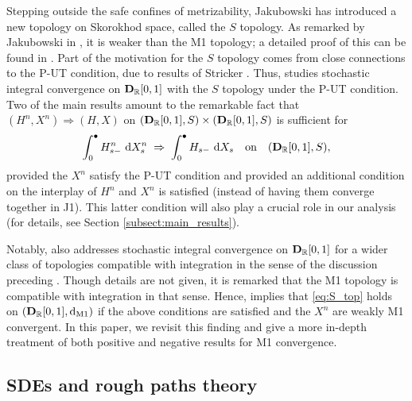 \documentclass[11pt]{article}
\theoremstyle{definition}\newtheorem{example}[theorem]{Example}
\theoremstyle{definition}\newtheorem{counterexample}[theorem]{Counterexample}
\theoremstyle{definition}\newtheorem{remark}[theorem]{Remark}
\theoremstyle{definition}\newtheorem{defi}[theorem]{Definition}
\numberwithin{equation}{section}
\newcommand{\R}{\mathbb{R}}
\newcommand{\D}{{\bf D}}											%
\newcommand*\diff{\mathop{}\!\mathrm{d}}								%
\renewcommand{\|}{\; : \, \;}											%
\newcommand{\dM}{\diff_{\operatorname{M1}}}							%
\begin{document}
Stepping outside the safe confines of metrizability, Jakubowski \cite{jakubowski2} has introduced a new topology on Skorokhod space, called the $S$ topology. As remarked by Jakubowski in \cite{jakubowski}, it is weaker than the M1 topology; a detailed proof of this can be found in \cite{balanjakubowski}. Part of the motivation for the $S
$ topology comes from close connections to the P-UT condition, due to results of Stricker \cite{stricker}. Thus, \cite{jakubowski} studies stochastic integral convergence on $\D_{\R}[0,1]$ with the $S$ topology under the P-UT condition. Two of the main results \cite[Thms.~1 and 6]{jakubowski} amount to the remarkable fact that $(H^n,X^n)\Rightarrow (H,X)$ on $(\D_{\R}[0,1],S) \times (\D_{\R}[0,1],S)$ is sufficient for
\begin{equation}\label{eq:S_top}
	\int_0^\bullet H^n_{s-} \, \diff X^n_s \; \Rightarrow \; \int_0^\bullet H_{s-} \, \diff X_s \quad \text{on} \quad (\D_{\R}[0,1],S),
\end{equation}
provided the $X^n$ satisfy the P-UT condition and provided an additional condition on the interplay of $H^n$ and $X^n$ is satisfied (instead of having them converge together in J1). This latter condition will also play a crucial role in our analysis (for details, see Section \ref{subsect:main_results}).

Notably, \cite{jakubowski} also addresses stochastic integral convergence on $\D_{\R}[0,1]$ for a wider class of topologies compatible with integration in the sense of the discussion preceding \cite[Thm.~4]{jakubowski}. Though details are not given, it is remarked that the M1 topology is compatible with integration in that sense. Hence, \cite[Thm.~4]{jakubowski} implies that
\eqref{eq:S_top} holds on $(\D_{\R}[0,1],\dM)$ if the above conditions are satisfied and the $X^n$ are weakly M1 convergent. In this paper, we revisit this finding and give a more in-depth treatment of both positive and negative results for M1 convergence.

\subsection{SDEs and rough paths theory}
\end{document}
